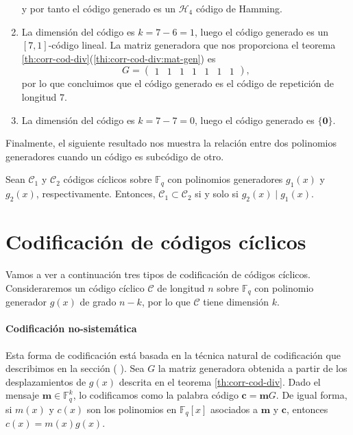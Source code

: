 \begin{example}
\begin{enumerate}
\[    \]
    y por tanto el código generado es un \(\mathcal H_4\) código de Hamming.
    \item La dimensión del código es \(k = 7 - 6 = 1\), luego el código generado es un \([7, 1]\)-código lineal.
    La matriz generadora que nos proporciona el teorema \ref{th:corr-cod-div}(\ref{thi:corr-cod-div:mat-gen}) es \[
      G = \left(\begin{array}{rrrrrrr}
        1 & 1 & 1 & 1 & 1 & 1 & 1
        \end{array}\right),
    \] por lo que concluimos que el código generado es el código de repetición de longitud \(7\).
    \item La dimensión del código es \(k = 7 - 7 = 0\), luego el código generado es \(\{\mathbf 0\}\).
  \end{enumerate}
\end{example}


Finalmente, el siguiente resultado nos muestra la relación entre dos polinomios generadores cuando un código es subcódigo de otro.

\begin{corollary}
  Sean \(\mathcal C_1\) y \(\mathcal C_2\) códigos cíclicos sobre \(\mathbb F_q\) con polinomios generadores \(g_1(x)\) y \(g_2(x)\), respectivamente.
  Entonces, \(\mathcal C_1 \subset \mathcal C_2 \) si y solo si \(g_2(x) \mid g_1(x)\).
\end{corollary}


\section{Codificación de códigos cíclicos}

Vamos a ver a continuación tres tipos de codificación de códigos cíclicos.
Consideraremos un código cíclico \(\mathcal C\) de longitud \(n\) sobre \(\mathbb F_q\) con polinomio generador \(g(x)\) de grado \(n - k\), por lo que \(\mathcal C\) tiene dimensión \(k\).

\paragraph{Codificación no-sistemática}

Esta forma de codificación está basada en la técnica natural de codificación que describimos en la sección (
).
Sea \(G\) la matriz generadora obtenida a partir de los desplazamientos de \(g(x)\) descrita en el teorema \ref{th:corr-cod-div}.
Dado el mensaje \(\mathbf m \in \mathbb F_q^k\), lo codificamos como la palabra código \(\mathbf c = \mathbf mG\).
De igual forma, si \(m(x)\) y \(c(x)\) son los polinomios en \(\mathbb F_q[x]\) asociados a \(\mathbf{m}\) y \(\mathbf c\), entonces \(c(x) = m(x)g(x)\).

